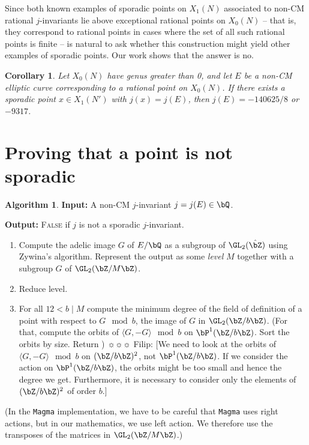 \documentclass[11pt,reqno]{amsart}
\theoremstyle{plain}
\newtheorem{corollary}[theorem]{Corollary}
\theoremstyle{definition}
\newtheorem{algorithm}[theorem]{Algorithm}
\newcommand{\Q}{\bQ}
\newcommand{\Z}{\bZ}
\newcommand{\filip}[1]{{\color{cyan} \textsf{$\sun\sun\sun$ Filip: [#1]}}}
\begin{document}
Since both known examples of sporadic points on $X_1(N)$ associated to non-CM rational $j$-invariants lie above exceptional rational points on $X_0(N)$ -- that is, they correspond to rational points in cases where the set of all such rational points is finite -- is natural to ask whether this construction might yield other examples of sporadic points. Our work shows that the answer is no.
\begin{corollary}
Let $X_0(N)$ have genus greater than 0, and let $E$ be a non-CM elliptic curve corresponding to a rational point on $X_0(N)$. If there exists a sporadic point $x \in X_1(N')$ with $j(x)=j(E)$, then $j(E) =-140625/8$ or $-9317$.
\end{corollary}

\section{Proving that a point is not sporadic}

\begin{algorithm}
\textbf{Input:} A non-CM $j$-invariant $j = j(E) \in \Q$.

\textbf{Output:} \textsc{False} if $j$ is not a sporadic $j$-invariant.

\begin{enumerate}
    \item Compute the adelic image $G$ of $E/\Q$ as a subgroup of $\GL_2(\hat{\Z})$ using Zywina's algorithm. Represent the output as some \emph{level} $M$ together with a subgroup $G$ of $\GL_2(\Z/M\Z)$.

    \item Reduce level.

    \item For all $12 < b \mid M$ compute the minimum degree of the field of definition of a point with respect to $G \mod b$, the image of $G$ in $\GL_2(\Z/b\Z)$. (For that, compute the orbits of $\langle G, -G \rangle \mod b$ on $\bP^1(\Z/b\Z)$. Sort the orbits by size. Return ) \filip{We need to look at the orbits of $\langle G, -G \rangle \mod b$ on $(\Z/b\Z)^2$, not $\bP^1(\Z/b\Z)$. If we consider the action on $\bP^1(\Z/b\Z)$, the orbits might be too small and hence the degree we get. Furthermore, it is necessary to consider only the elements of $(\Z/b\Z)^2$ of order $b$.}
\end{enumerate}
\end{algorithm}

(In the \texttt{Magma} implementation, we have to be careful that \texttt{Magma} uses right actions, but in our mathematics, we use left action. We therefore use the transposes of the matrices in $\GL_2(\Z/M\Z)$.)


\vspace{20 mm}


\end{document}
